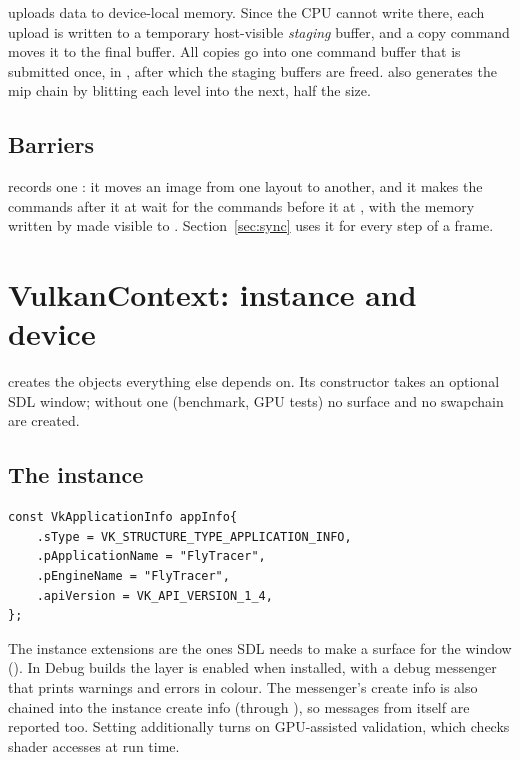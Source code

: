 \documentclass[11pt,a4paper]{article}
\begin{document}
 uploads data to device-local memory. Since the CPU cannot write there, each upload is written to a temporary host-visible \emph{staging} buffer, and a copy command moves it to the final buffer. All copies go into one command buffer that is submitted once, in , after which the staging buffers are freed.  also generates the mip chain by blitting each level into the next, half the size.

\subsection{Barriers}

 records one : it moves an image from one layout to another, and it makes the commands after it at  wait for the commands before it at , with the memory written by  made visible to . Section~\ref{sec:sync} uses it for every step of a frame.

\section{VulkanContext: instance and device}

 creates the objects everything else depends on. Its constructor takes an optional SDL window; without one (benchmark, GPU tests) no surface and no swapchain are created.

\subsection{The instance}

\begin{lstlisting}
const VkApplicationInfo appInfo{
    .sType = VK_STRUCTURE_TYPE_APPLICATION_INFO,
    .pApplicationName = "FlyTracer",
    .pEngineName = "FlyTracer",
    .apiVersion = VK_API_VERSION_1_4,
};
\end{lstlisting}

The instance extensions are the ones SDL needs to make a surface for the window (). In Debug builds the  layer is enabled when installed, with a debug messenger that prints warnings and errors in colour. The messenger's create info is also chained into the instance create info (through ), so messages from  itself are reported too. Setting  additionally turns on GPU-assisted validation, which checks shader accesses at run time.
\end{document}
